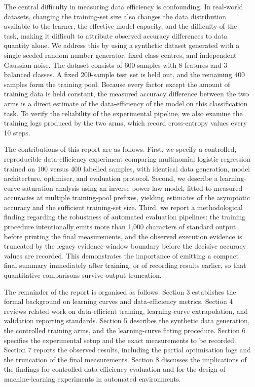 \documentclass{article}
\begin{document}
The central difficulty in measuring data efficiency is confounding. In real-world datasets, changing the training-set size also changes the data distribution available to the learner, the effective model capacity, and the difficulty of the task, making it difficult to attribute observed accuracy differences to data quantity alone. We address this by using a synthetic dataset generated with a single seeded random number generator, fixed class centres, and independent Gaussian noise. The dataset consists of 600 samples with 8 features and 3 balanced classes. A fixed 200-sample test set is held out, and the remaining 400 samples form the training pool. Because every factor except the amount of training data is held constant, the measured accuracy difference between the two arms is a direct estimate of the data-efficiency of the model on this classification task. To verify the reliability of the experimental pipeline, we also examine the training logs produced by the two arms, which record cross-entropy values every 10 steps.

The contributions of this report are as follows. First, we specify a controlled, reproducible data-efficiency experiment comparing multinomial logistic regression trained on 100 versus 400 labelled samples, with identical data generation, model architecture, optimiser, and evaluation protocol. Second, we describe a learning-curve saturation analysis using an inverse power-law model, fitted to measured accuracies at multiple training-pool prefixes, yielding estimates of the asymptotic accuracy and the sufficient training-set size. Third, we report a methodological finding regarding the robustness of automated evaluation pipelines: the training procedure intentionally emits more than 1{,}000 characters of standard output before printing the final measurements, and the observed execution evidence is truncated by the legacy evidence-window boundary before the decisive accuracy values are recorded. This demonstrates the importance of emitting a compact final summary immediately after training, or of recording results earlier, so that quantitative comparisons survive output truncation.

The remainder of the report is organised as follows. Section 3 establishes the formal background on learning curves and data-efficiency metrics. Section 4 reviews related work on data-efficient training, learning-curve extrapolation, and validation reporting standards. Section 5 describes the synthetic data generation, the controlled training arms, and the learning-curve fitting procedure. Section 6 specifies the experimental setup and the exact measurements to be recorded. Section 7 reports the observed results, including the partial optimisation logs and the truncation of the final measurements. Section 8 discusses the implications of the findings for controlled data-efficiency evaluation and for the design of machine-learning experiments in automated environments.
\end{document}
